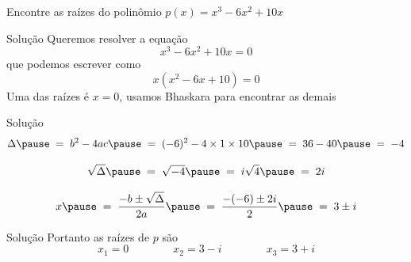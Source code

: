 \begin{question}
  Encontre as raízes do polinômio \(p(x) = x^3 -6x^2 + 10x\)
\end{question}

\begin{resolution}{Solução}
  Queremos resolver a equação
  \[
    x^3 -6x^2 + 10x = 0
  \]
  \pause
  que podemos escrever como
  \[
    x\left(x^2 -6x + 10\right) = 0
  \]
  \pause
  Uma das raízes é \(x=0\), usamos Bhaskara para encontrar as demais
\end{resolution}

\begin{resolution}{Solução}
  \[
    \Delta
    \pause
    \;=\; b^2 - 4ac
    \pause
    \;=\; (-6)^2 - 4 \times 1 \times 10
    \pause
    \;=\; 36 - 40
    \pause
    \;=\; -4
  \]

  \pause
  \vspace{0.5\baselineskip}
  \[
    \sqrt{\Delta}
    \pause
    \;=\; \sqrt{-4}
    \pause
    \;=\; i\sqrt{4}
    \pause
    \;=\; 2i
  \]

  \pause
  \vspace{0.5\baselineskip}
  \[
    x
    \pause
    \;=\; \frac{-b\pm\sqrt{\Delta}}{2a}
    \pause
    \;=\; \frac{-(-6)\pm 2i}{2}
    \pause
    \;=\; 3\pm i
  \]
\end{resolution}

\begin{resolution}{Solução}
  Portanto as raízes de $p$ são
  \[
    x_1 = 0 \qquad\qquad
    x_2 = 3-i \qquad\qquad
    x_3 = 3+i
  \]
\end{resolution}

